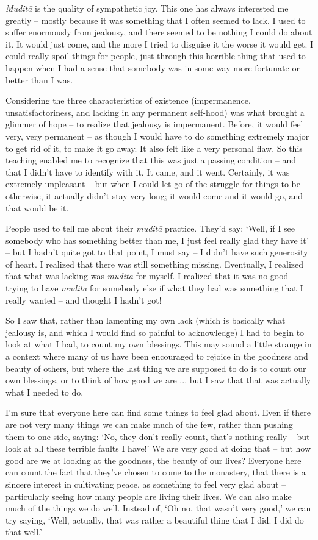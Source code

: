 \textit{Mudit\=a} is the quality of sympathetic joy. This one has always interested me greatly -- mostly because it was something that I often seemed to lack. I used to suffer enormously from jealousy, and there seemed to be nothing I could do about it. It would just come, and the more I tried to disguise it the worse it would get. I could really spoil things for people, just through this horrible thing that used to happen when I had a sense that somebody was in some way more fortunate or better than I was. 

Considering the three characteristics of existence (impermanence, unsatisfactoriness, and lacking in any permanent self-hood) was what brought a glimmer of hope -- to realize that jealousy is impermanent. Before, it would feel very, very permanent -- as though I would have to do something extremely major to get rid of it, to make it go away. It also felt like a very personal flaw. So this teaching enabled me to recognize that this was just a passing condition -- and that I didn't have to identify with it. It came, and it went. Certainly, it was extremely unpleasant -- but when I could let go of the struggle for things to be otherwise, it actually didn't stay very long; it would come and it would go, and that would be it.

People used to tell me about their \textit{mudit\=a} practice. They'd say: `Well, if I see somebody who has something better than me, I just feel really glad they have it' -- but I hadn't quite got to that point, I must say -- I didn't have such generosity of heart. I realized that there was still something missing. Eventually, I realized that what was lacking was \textit{mudit\=a} for myself. I realized that it was no good trying to have \textit{mudit\=a} for somebody else if what they had was something that I really wanted -- and thought I hadn't got!

So I saw that, rather than lamenting my own lack (which is basically what jealousy is, and which I would find so painful to acknowledge) I had to begin to look at what I had, to count my own blessings. This may sound a little strange in a context where many of us have been encouraged to rejoice in the goodness and beauty of others, but where the last thing we are supposed to do is to count our own blessings, or to think of how good we are ... but I saw that that was actually what I needed to do.

I'm sure that everyone here can find some things to feel glad about. Even if there are not very many things we can make much of the few, rather than pushing them to one side, saying: `No, they don't really count, that's nothing really -- but look at all these terrible faults I have!' We are very good at doing that -- but how good are we at looking at the goodness, the beauty of our lives? Everyone here can count the fact that they've chosen to come to the monastery, that there is a sincere interest in cultivating peace, as something to feel very glad about -- particularly seeing how many people are living their lives. We can also make much of the things we do well. Instead of, `Oh no, that wasn't very good,' we can try saying, `Well, actually, that was rather a beautiful thing that I did. I did do that well.' 

